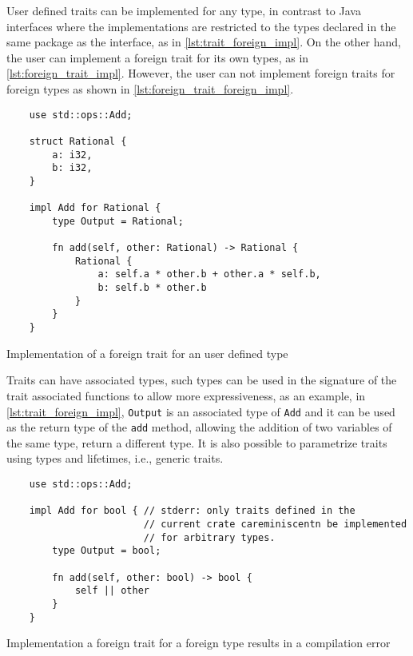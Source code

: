 User defined traits can be implemented for any type, in contrast to Java interfaces where the implementations are restricted to the types declared in the same package as the interface, as in \ref{lst:trait_foreign_impl}. On the other hand, the user can implement a foreign trait for its own types, as in \ref{lst:foreign_trait_impl}. However, the user can not implement foreign traits for foreign types as shown in \ref{lst:foreign_trait_foreign_impl}.

\begin{listing}[ht]
	\begin{verbatim}
    use std::ops::Add;

    struct Rational {
        a: i32,
        b: i32,
    }

    impl Add for Rational {
        type Output = Rational;
        
        fn add(self, other: Rational) -> Rational {
            Rational {
                a: self.a * other.b + other.a * self.b,
                b: self.b * other.b
            }
        }
    }
    \end{verbatim}
  \caption{Implementation of a foreign trait for an user defined type}
  \label{lst:foreign_trait_impl}
\end{listing}

Traits can have associated types, such types can be used in the signature of the trait associated functions to allow more expressiveness, as an example, in \ref{lst:trait_foreign_impl}, \texttt{Output} is an associated type of \texttt{Add} and it can be used as the return type of the \texttt{add} method, allowing the addition of two variables of the same type, return a different type. It is also possible to parametrize traits using types and lifetimes, i.e., generic traits.

\begin{listing}[ht]
	\begin{verbatim}
    use std::ops::Add;

    impl Add for bool { // stderr: only traits defined in the
                        // current crate careminiscentn be implemented 
                        // for arbitrary types.
        type Output = bool;
        
        fn add(self, other: bool) -> bool {
            self || other
        }
    }
    \end{verbatim}
  \caption{Implementation a foreign trait for a foreign type results in a compilation error}
  \label{lst:foreign_trait_foreign_impl}
\end{listing}

